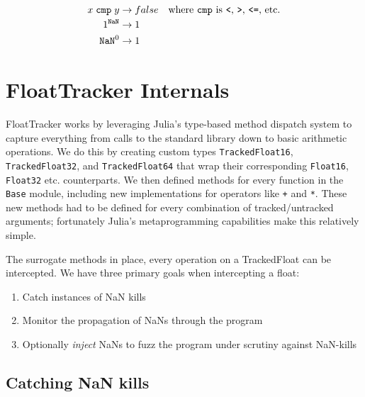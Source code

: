 \documentclass{juliacon}
\begin{document}
\begin{align*}
x \; \texttt{cmp} \; y &\rightarrow false &\text{where \texttt{cmp} is \texttt{<}, \texttt{>}, \texttt{<=}, etc.} \\
1^{\text{\texttt{NaN}}} &\rightarrow 1 \\
\text{\texttt{NaN}}^{0} &\rightarrow 1
\end{align*}



\section{FloatTracker Internals}

FloatTracker works by leveraging Julia's type-based method dispatch system to capture everything from calls to the standard library down to basic arithmetic operations.
We do this by creating custom types \texttt{TrackedFloat16}, \texttt{TrackedFloat32}, and \texttt{TrackedFloat64} that wrap their corresponding \texttt{Float16}, \texttt{Float32} etc. counterparts.
We then defined methods for every function in the \texttt{Base} module, including new implementations for operators like \texttt{+} and \texttt{*}.
These new methods had to be defined for every combination of tracked/untracked arguments;
fortunately Julia's metaprogramming capabilities make this relatively simple.

The surrogate methods in place, every operation on a TrackedFloat can be intercepted.
We have three primary goals when intercepting a float:

\begin{enumerate}
  \item Catch instances of NaN kills
  \item Monitor the propagation of NaNs through the program
  \item Optionally \emph{inject} NaNs to fuzz the program under scrutiny against NaN-kills
\end{enumerate}

%

\subsection{Catching NaN kills}
\end{document}
